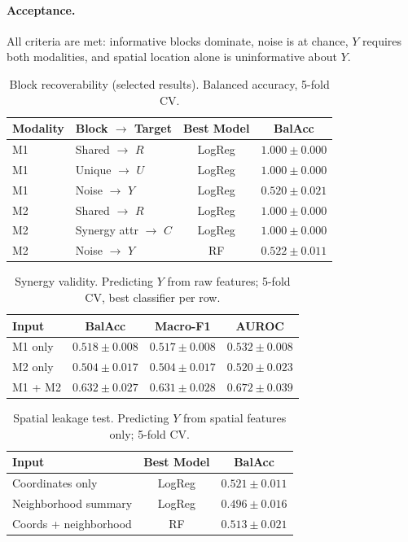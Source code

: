 \documentclass{article}
\theoremstyle{plain}
\theoremstyle{definition}
\begin{document}
\paragraph{Acceptance.}
All criteria are met: informative blocks dominate, noise is at chance, $Y$ requires both modalities, and spatial location alone is uninformative about $Y$.

\begin{table}[H]
\centering
\caption{Block recoverability (selected results). Balanced accuracy, 5-fold CV.}
\label{tab:sim-phase1-block}
\small
\begin{tabular}{llcc}
\toprule
Modality & Block $\to$ Target & Best Model & BalAcc \\
\midrule
M1   & Shared $\to$ $R$       & LogReg & $1.000 \pm 0.000$ \\
M1   & Unique $\to$ $U$       & LogReg & $1.000 \pm 0.000$ \\
M1   & Noise $\to$ $Y$        & LogReg & $0.520 \pm 0.021$ \\
M2   & Shared $\to$ $R$       & LogReg & $1.000 \pm 0.000$ \\
M2   & Synergy attr $\to$ $C$ & LogReg & $1.000 \pm 0.000$ \\
M2   & Noise $\to$ $Y$        & RF     & $0.522 \pm 0.011$ \\
\bottomrule
\end{tabular}
\end{table}

\begin{table}[H]
\centering
\caption{Synergy validity. Predicting $Y$ from raw features; 5-fold CV, best classifier per row.}
\label{tab:sim-phase1-synergy}
\small
\begin{tabular}{lccc}
\toprule
Input & BalAcc & Macro-F1 & AUROC \\
\midrule
M1 only       & $0.518 \pm 0.008$ & $0.517 \pm 0.008$ & $0.532 \pm 0.008$ \\
M2 only       & $0.504 \pm 0.017$ & $0.504 \pm 0.017$ & $0.520 \pm 0.023$ \\
M1 + M2       & $\mathbf{0.632 \pm 0.027}$ & $\mathbf{0.631 \pm 0.028}$ & $\mathbf{0.672 \pm 0.039}$ \\
\bottomrule
\end{tabular}
\end{table}

\begin{table}[H]
\centering
\caption{Spatial leakage test. Predicting $Y$ from spatial features only; 5-fold CV.}
\label{tab:sim-phase1-spatial}
\small
\begin{tabular}{lcc}
\toprule
Input & Best Model & BalAcc \\
\midrule
Coordinates only          & LogReg & $0.521 \pm 0.011$ \\
Neighborhood summary      & LogReg & $0.496 \pm 0.016$ \\
Coords + neighborhood     & RF     & $0.513 \pm 0.021$ \\
\bottomrule
\end{tabular}
\end{table}
\end{document}
